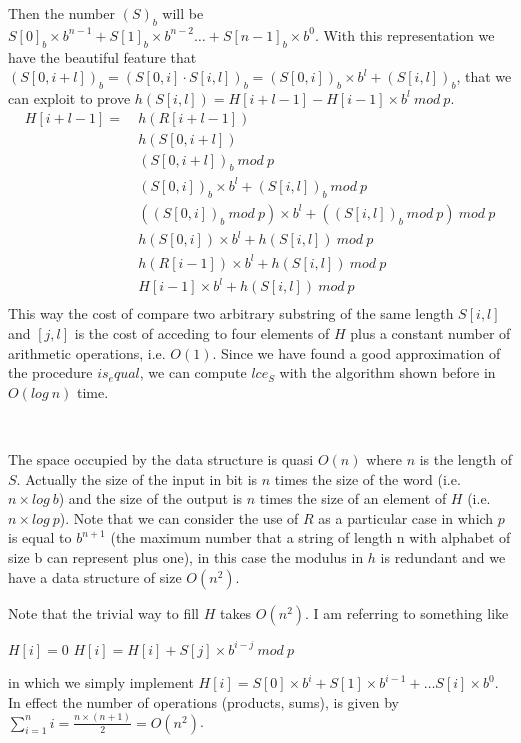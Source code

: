 \documentclass[a4paper]{article}
\begin{document}
Then the number $(S)_b$ will be $S[0]_b \times b^{n - 1} + S[1]_b \times b^{n - 2} \dots + S[n-1]_b \times b^{0}$.
With this representation we have the beautiful feature that $(S[0, i+l])_b = (S[0,i] \cdot S[i,l])_b = (S[0,i])_b \times b^l + (S[i,l])_b$, that we can exploit to prove $h(S[i, l]) = H[i + l - 1] - H[i - 1] \times b^l \ mod\ p$.
\begin{align*}				
	     H[i+l-1] =\ & h(R[i+l-1]) \\
	 				& h(S[0, i+l]) \\
	 				& (S[0, i+l])_b\ mod\ p \\
        				& (S[0,i])_b \times b^l + (S[i,l])_b\ mod\ p \\
        				& ((S[0,i])_b\ mod\ p) \times b^l + ((S[i,l])_b\ mod\ p)\ mod\ p \\
        				& h(S[0,i]) \times b^l + h(S[i,l])\ mod\ p \\
        				& h(R[i-1]) \times b^l + h(S[i,l])\ mod\ p \\
        				& H[i-1] \times b^l + h(S[i,l])\ mod\ p \\
\end{align*}
This way the cost of compare two arbitrary substring of the same length $S[i,l]$ and $[j,l]$ is the cost of acceding to four elements of $H$ plus a constant number of arithmetic operations, i.e. $O(1)$.
Since we have found a good approximation of the procedure $is_equal$, we can compute $lce_S$ with the algorithm shown before in $O(log\ n)$ time.

\

\noindent
The space occupied by the data structure is quasi $O(n)$ where $n$ is the length of $S$.
Actually the size of the input in bit is $n$ times the size of the word (i.e. $n \times log\ b$) and the size of the output is $n$ times the size of an element of $H$ (i.e. $n \times log\ p$).
Note that we can consider the use of $R$ as a particular case in which $p$ is equal to $b^{n + 1}$ (the maximum number that a string of length n with alphabet of size b can represent plus one), in this case the modulus in $h$ is redundant and we have a data structure of size $O(n^2)$.

Note that the trivial way to fill $H$ takes $O(n^2)$.
I am referring to something like
\begin{algorithmic}
	\State $H[i] = 0$
		\State $H[i] = H[i] + S[j]\times b^{i-j}\ mod\ p$
	\EndFor
\EndFor
\end{algorithmic}
in which we simply implement $H[i] = S[0] \times b^i + S[1] \times b^{i - 1} + \dots S[i] \times b^0$.
In effect the number of operations (products, sums), is given by  $\sum_{i=1}^n i = \frac{n \times (n+1)}{2} = O(n^2)$.
\end{document}

